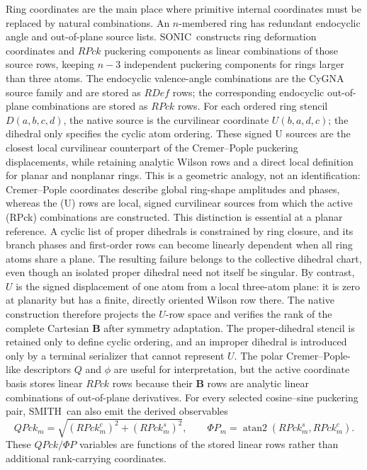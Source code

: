 \documentclass[journal=jctcce,manuscript=article,layout=traditional]{achemso}
\newcommand{\SONIC}{SONIC}
\newcommand{\SMITH}{\textsc{SMITH}}
\newcommand{\Bmat}{\mathbf{B}}
\theoremstyle{definition}
\begin{document}
Ring coordinates are the main place where primitive internal coordinates must
be replaced by natural combinations.  An \(n\)-membered ring has redundant
endocyclic angle and out-of-plane source lists.  \SONIC\ constructs ring deformation
coordinates and \(RPck\) puckering components as linear combinations of those
source rows, keeping \(n-3\) independent puckering components for rings larger
than three atoms.  The endocyclic valence-angle combinations are the CyGNA
source family and are stored as \(RDef\) rows; the corresponding endocyclic
out-of-plane combinations are stored as \(RPck\) rows.  For each ordered ring
stencil \(D(a,b,c,d)\), the native source is the curvilinear coordinate
\(U(b,a,d,c)\); the dihedral only specifies the cyclic atom ordering.  These
signed U sources are the closest local curvilinear counterpart of the
Cremer--Pople puckering displacements, while retaining analytic Wilson rows
and a direct local definition for planar and nonplanar rings.  This is a
geometric analogy, not an identification: Cremer--Pople coordinates describe
global ring-shape amplitudes and phases, whereas the (U) rows are local,
signed curvilinear sources from which the active (RPck) combinations are
constructed.  This distinction is essential at a planar reference.  A cyclic
list of proper dihedrals is constrained by ring closure, and its branch phases
and first-order rows can become linearly dependent when all ring atoms share a
plane.  The resulting failure belongs to the collective dihedral chart, even
though an isolated proper dihedral need not itself be singular.  By contrast,
\(U\) is the signed displacement of one atom from a local three-atom plane: it
is zero at planarity but has a finite, directly oriented Wilson row there.
The native construction therefore projects the \(U\)-row space and verifies
the rank of the complete Cartesian \(\Bmat\) after symmetry adaptation.  The
proper-dihedral stencil is retained only to define cyclic ordering, and an
improper dihedral is introduced only by a terminal serializer that cannot
represent \(U\).  The polar
Cremer--Pople-like descriptors \(Q\) and \(\phi\) are useful for
interpretation, but the active coordinate basis stores linear \(RPck\) rows
because their \(\Bmat\) rows are analytic linear combinations of out-of-plane
derivatives.\cite{CremerPople1975}
For every selected cosine--sine puckering pair, \SMITH\ can also emit the
derived observables
\begin{equation}
\label{eq:puckering-polar-observables}
  QPck_m=\sqrt{(RPck_m^c)^2+(RPck_m^s)^2},\qquad
  \Phi P_m=\operatorname{atan2}(RPck_m^s,RPck_m^c).
\end{equation}
These \(QPck/\Phi P\) variables are functions of the stored linear rows rather
than additional rank-carrying coordinates.
\end{document}
